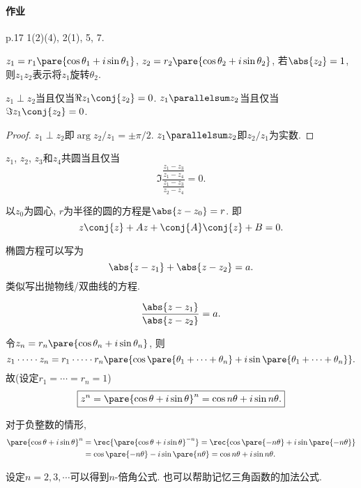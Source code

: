 \documentclass{ctexart}
\begin{document}
\paragraph{作业} %
\label{par:作业}

p.17 1(2)(4), 2(1), 5, 7.


\begin{sample}
    \begin{ex}
        $z_1 = r_1\pare{\cos\theta_1 + i\sin\theta_1}$, $z_2 = r_2\pare{\cos\theta_2+i\sin\theta_2}$, 若$\abs{z_2}=1$, 则$z_1z_2$表示将$z_1$旋转$\theta_2$.
    \end{ex}
    \begin{ex}
        $z_1\perp z_2$当且仅当$\Re z_1\conj{z_2} = 0$. $z_1\parallelsum z_2$当且仅当$\Im z_1\conj{z_2} = 0$.
    \end{ex}
    \begin{proof}
        $z_1\perp z_2$即$\arg z_2/z_1 = \pm \pi/2$. $z_1\parallelsum z_2$即$z_2/z_1$为实数.
    \end{proof}
    \begin{ex}
        $z_1$, $z_2$, $z_3$和$z_4$共圆当且仅当
        \[ \Im \frac{\frac{z_1-z_3}{z_1-z_4}}{\frac{z_1-z_3}{z_2-z_4}} = 0. \]
    \end{ex}
    \begin{ex}
        以$z_0$为圆心, $r$为半径的圆的方程是$\abs{z-z_0} = r$. 即\inlinehardlink{\eqref{eq:复数平方和展开}}
        \[ z\conj{z} + Az + \conj{A}\conj{z} + B = 0. \]
    \end{ex}
    \begin{ex}
        椭圆方程可以写为
        \[ \abs{z-z_1} + \abs{z-z_2} = a. \]
        类似写出抛物线/双曲线的方程.
    \end{ex}
    \begin{ex}[Apollonius圆]
        \[ \frac{\abs{z-z_1}}{\abs{z-z_2}} = a. \]
    \end{ex}
\end{sample}
\begin{theorem}[De Moivre公式]
    令$z_n = r_n\pare{\cos\theta_n + i\sin \theta_n}$, 则
    \[ z_1\cdot \cdots \cdot z_n = r_1\cdot\cdots\cdot r_n\pare{\cos\pare{\theta_1+\cdots + \theta_n} + i\sin\pare{\theta_1 + \cdots + \theta_n}}. \]
    故(设定$r_1 = \cdots = r_n = 1$)
    \[ \boxed{z^n = \pare{\cos\theta + i\sin\theta}^n = \cos n\theta + i\sin n\theta.} \]
\end{theorem}
\begin{remark}
    对于负整数的情形,
    \begin{align*}
        \pare{\cos\theta+i\sin\theta}^n & = \rec{\pare{\cos\theta + i\sin\theta}^{-n}} = \rec{\cos\pare{-n\theta} + i\sin\pare{-n\theta}} \\
        & = \cos\pare{-n\theta} - i\sin \pare{n\theta} = \cos n\theta + i\sin n\theta. 
    \end{align*}
\end{remark}
\begin{remark}
    设定$n=2,3,\cdots$可以得到$n$-倍角公式. 也可以帮助记忆三角函数的加法公式.
\end{remark}
\end{document}
